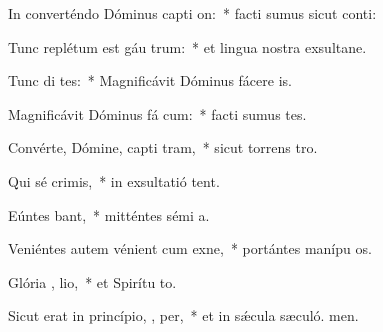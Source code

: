 \item In converténdo Dóminus capti on:~* facti sumus sicut conti:
\item Tunc replétum est gáu  trum:~* et lingua nostra exsultane.
\item Tunc di  tes:~* Magnificávit Dóminus fácere  is.
\item Magnificávit Dóminus fá cum:~* facti sumus tes.
\item Convérte, Dómine, capti tram,~* sicut torrens  tro.
\item Qui sé  crimis,~* in exsultatió tent.
\item Eúntes   bant,~* mitténtes sémi a.
\item Veniéntes autem vénient cum exne,~* portántes manípu os.
\item Glória ,  lio,~* et Spirítu to.
\item Sicut erat in princípio,  ,  per,~* et in sǽcula sæculó. men.
